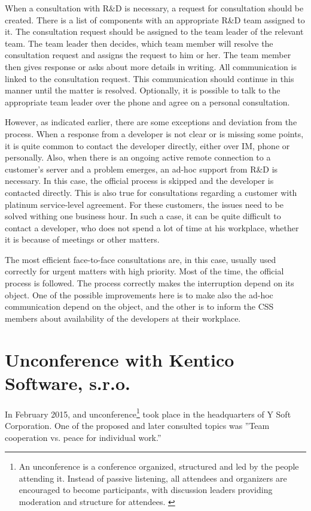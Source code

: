 \documentclass[11pt,singleside]{myfithesis2}
\begin{document}
When a consultation with R\&D is necessary, a request for consultation should be created. There is a list of components with an appropriate R\&D team assigned to it. The consultation request should be assigned to the team leader of the relevant team. The team leader then decides, which team member will resolve the consultation request and assigns the request to him or her. The team member then gives response or asks about more details in writing. All communication is linked to the consultation request. This communication should continue in this manner until the matter is resolved. Optionally, it is possible to talk to the appropriate team leader over the phone and agree on a personal consultation.

However, as indicated earlier, there are some exceptions and deviation from the process. When a response from a developer is not clear or is missing some points, it is quite common to contact the developer directly, either over IM, phone or personally. Also, when there is an ongoing active remote connection to a customer's server and a problem emerges, an ad-hoc support from R\&D is necessary. In this case, the official process is skipped and the developer is contacted directly. This is also true for consultations regarding a customer with platinum service-level agreement. For these customers, the issues need to be solved withing one business hour. In such a case, it can be quite difficult to contact a developer, who does not spend a lot of time at his workplace, whether it is because of meetings or other matters.

The most efficient face-to-face consultations are, in this case, usually used correctly for urgent matters with high priority. Most of the time, the official process is followed. The process correctly makes the interruption depend on its object. One of the possible improvements here is to make also the ad-hoc communication depend on the object, and the other is to inform the CSS members about availability of the developers at their workplace.


	\section{Unconference with Kentico Software, s.r.o.}\label{Kentico}
In February 2015, and unconference\footnote{An unconference is a conference organized, structured and led by the people attending it. Instead of passive listening, all attendees and organizers are encouraged to become participants, with discussion leaders providing moderation and structure for attendees. \cite{unconference}} took place in the headquarters of Y Soft Corporation. One of the proposed and later consulted topics was ''Team cooperation vs. peace for individual work.''
\end{document}

